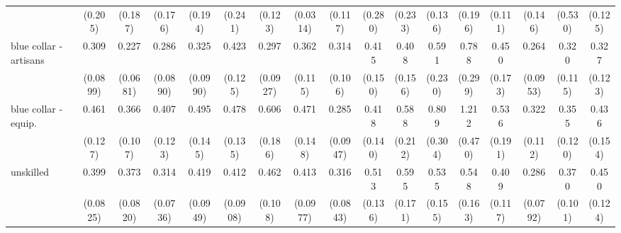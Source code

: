 {\begin{tabular}{l*{16}{c}}
                    &     (0.205)         &     (0.187)         &     (0.176)         &     (0.194)         &     (0.241)         &     (0.123)         &    (0.0314)         &     (0.117)         &     (0.280)         &     (0.233)         &     (0.136)         &     (0.196)         &     (0.111)         &     (0.146)         &     (0.530)         &     (0.125)         \\
[1em]
blue collar - artisans&       0.309\sym{***}&       0.227\sym{***}&       0.286\sym{***}&       0.325\sym{***}&       0.423\sym{**} &       0.297\sym{***}&       0.362\sym{**} &       0.314\sym{***}&       0.415\sym{*}  &       0.408\sym{*}  &       0.591         &       0.788         &       0.450\sym{*}  &       0.264\sym{***}&       0.320\sym{**} &       0.327\sym{**} \\
                    &    (0.0899)         &    (0.0681)         &    (0.0890)         &    (0.0990)         &     (0.125)         &    (0.0927)         &     (0.115)         &     (0.106)         &     (0.150)         &     (0.156)         &     (0.230)         &     (0.299)         &     (0.173)         &    (0.0953)         &     (0.115)         &     (0.123)         \\
[1em]
blue collar - equip.&       0.461\sym{**} &       0.366\sym{***}&       0.407\sym{**} &       0.495\sym{*}  &       0.478\sym{**} &       0.606         &       0.471\sym{*}  &       0.285\sym{***}&       0.418\sym{**} &       0.588         &       0.809         &       1.212         &       0.536         &       0.322\sym{**} &       0.355\sym{**} &       0.436\sym{*}  \\
                    &     (0.127)         &     (0.107)         &     (0.123)         &     (0.145)         &     (0.135)         &     (0.186)         &     (0.148)         &    (0.0947)         &     (0.140)         &     (0.212)         &     (0.304)         &     (0.470)         &     (0.191)         &     (0.112)         &     (0.120)         &     (0.154)         \\
[1em]
unskilled           &       0.399\sym{***}&       0.373\sym{***}&       0.314\sym{***}&       0.419\sym{***}&       0.412\sym{***}&       0.462\sym{***}&       0.413\sym{***}&       0.316\sym{***}&       0.513\sym{*}  &       0.595         &       0.535\sym{*}  &       0.548\sym{*}  &       0.409\sym{**} &       0.286\sym{***}&       0.370\sym{***}&       0.450\sym{**} \\
                    &    (0.0825)         &    (0.0820)         &    (0.0736)         &    (0.0949)         &    (0.0908)         &     (0.108)         &    (0.0977)         &    (0.0843)         &     (0.136)         &     (0.171)         &     (0.155)         &     (0.163)         &     (0.117)         &    (0.0792)         &     (0.101)         &     (0.124)         \\

\end{tabular}}
